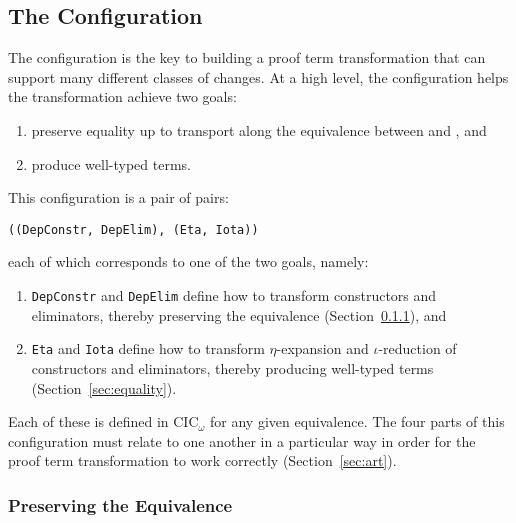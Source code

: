 \subsection{The Configuration}
\label{sec:configurable}

The configuration is the key to building a proof term transformation that can support many different classes of changes.
At a high level, the configuration helps the transformation achieve two goals:

\begin{enumerate}
\item preserve equality up to transport along the equivalence between \A and \B, and
\item produce well-typed terms.
\end{enumerate}
This configuration is a pair of pairs:

\begin{lstlisting}
((DepConstr, DepElim), (Eta, Iota))
\end{lstlisting}
each of which corresponds to one of the two goals, namely:

\begin{enumerate}
\item \lstinline{DepConstr} and \lstinline{DepElim} define how to transform constructors and eliminators, thereby preserving the equivalence (Section~\ref{sec:equivalence}), and 
\item \lstinline{Eta} and \lstinline{Iota} define how to transform $\eta$-expansion and $\iota$-reduction of constructors and eliminators, thereby producing well-typed terms (Section~\ref{sec:equality}).
\end{enumerate}
Each of these is defined in CIC$_{\omega}$ for any given equivalence.
The four parts of this configuration must relate to one another in a particular way in order for the proof
term transformation to work correctly (Section~\ref{sec:art}).

\subsubsection{Preserving the Equivalence}
\label{sec:equivalence}

